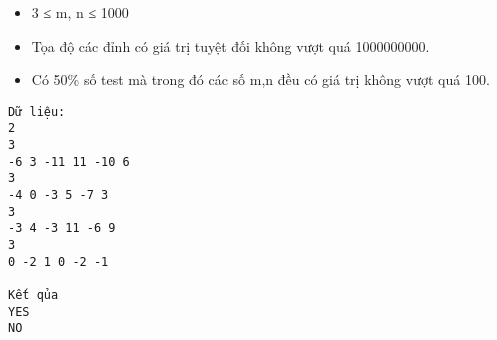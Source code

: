 \begin{itemize}
	\item     3 ≤ m, n ≤ 1000   
	\item     Tọa độ các đỉnh có giá trị tuyệt đối không vượt quá 1000000000.   
	\item     Có 50\% số test mà trong đó các số m,n đều có giá trị không vượt quá 100.   
\end{itemize}
\begin{verbatim}
Dữ liệu:
2
3
-6 3 -11 11 -10 6 
3
-4 0 -3 5 -7 3 
3
-3 4 -3 11 -6 9 
3
0 -2 1 0 -2 -1 

Kết qủa
YES
NO
\end{verbatim}